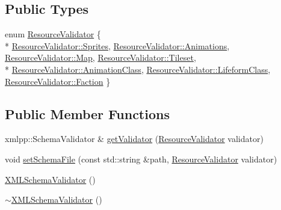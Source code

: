 \subsection*{Public Types}
\begin{DoxyCompactItemize}
\item 
enum \hyperlink{classZeta_1_1XMLSchemaValidator_a61084c788552321105d644d6678c2336}{Resource\+Validator} \{ \\*
\hyperlink{classZeta_1_1XMLSchemaValidator_a61084c788552321105d644d6678c2336a0c8651846cd269d069a6a93ddbfaedbf}{Resource\+Validator\+::\+Sprites}, 
\hyperlink{classZeta_1_1XMLSchemaValidator_a61084c788552321105d644d6678c2336a043d2f0a7edca94cae1cfbf3f90b3b68}{Resource\+Validator\+::\+Animations}, 
\hyperlink{classZeta_1_1XMLSchemaValidator_a61084c788552321105d644d6678c2336a46f3ea056caa3126b91f3f70beea068c}{Resource\+Validator\+::\+Map}, 
\hyperlink{classZeta_1_1XMLSchemaValidator_a61084c788552321105d644d6678c2336a42e17e503cf4d864f6ad8d95560c7a4e}{Resource\+Validator\+::\+Tileset}, 
\\*
\hyperlink{classZeta_1_1XMLSchemaValidator_a61084c788552321105d644d6678c2336a249459518d64e06627841e9d2a7143f6}{Resource\+Validator\+::\+Animation\+Class}, 
\hyperlink{classZeta_1_1XMLSchemaValidator_a61084c788552321105d644d6678c2336a822740da8be035f2a7c8ca8c809c0890}{Resource\+Validator\+::\+Lifeform\+Class}, 
\hyperlink{classZeta_1_1XMLSchemaValidator_a61084c788552321105d644d6678c2336a3dcd53a8339c060c69c660b1b89b5201}{Resource\+Validator\+::\+Faction}
 \}
\end{DoxyCompactItemize}
\subsection*{Public Member Functions}
\begin{DoxyCompactItemize}
\item 
xmlpp\+::\+Schema\+Validator \& \hyperlink{classZeta_1_1XMLSchemaValidator_ad173fc8edab52d1bc7e5e5e6c26200ee}{get\+Validator} (\hyperlink{classZeta_1_1XMLSchemaValidator_a61084c788552321105d644d6678c2336}{Resource\+Validator} validator)
\item 
void \hyperlink{classZeta_1_1XMLSchemaValidator_a563ff9a519c85e1a102cfd7ff36ed0e1}{set\+Schema\+File} (const std\+::string \&path, \hyperlink{classZeta_1_1XMLSchemaValidator_a61084c788552321105d644d6678c2336}{Resource\+Validator} validator)
\item 
\hyperlink{classZeta_1_1XMLSchemaValidator_a51454f399638f4953ff02c851fdb082e}{X\+M\+L\+Schema\+Validator} ()
\item 
\hyperlink{classZeta_1_1XMLSchemaValidator_aedadb0fd6f2a4060555f795ed0ae0150}{$\sim$\+X\+M\+L\+Schema\+Validator} ()
\end{DoxyCompactItemize}

